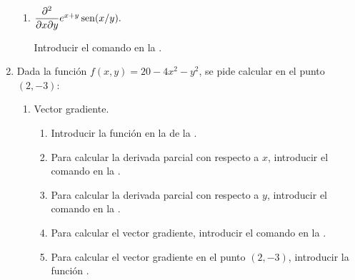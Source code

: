 \begin{enumerate}[leftmargin=*]
\begin{enumerate}
      \item  $\dfrac{\partial ^{2}}{\partial x\partial y}e^{x+y}\operatorname{sen}(x/y).$
            \begin{indication}
            Introducir el comando  en la .
            \end{indication}
      \end{enumerate}

\item Dada la función $f(x,y)=20-4x^2-y^2$, se pide calcular en el punto $(2,-3)$:
      \begin{enumerate}
      \item Vector gradiente.
            \begin{indication}
            \begin{enumerate}
            \item Introducir la función  en la  de la .
            \item Para calcular la derivada parcial con respecto a $x$, introducir el comando  en la .
            \item Para calcular la derivada parcial con respecto a $y$, introducir el comando  en la .
            \item Para calcular el vector gradiente, introducir el comando  en la .
            \item Para calcular el vector gradiente en el punto $(2,-3)$, introducir la función .
            \end{enumerate}
            \end{indication}


\end{enumerate}
\end{enumerate}

